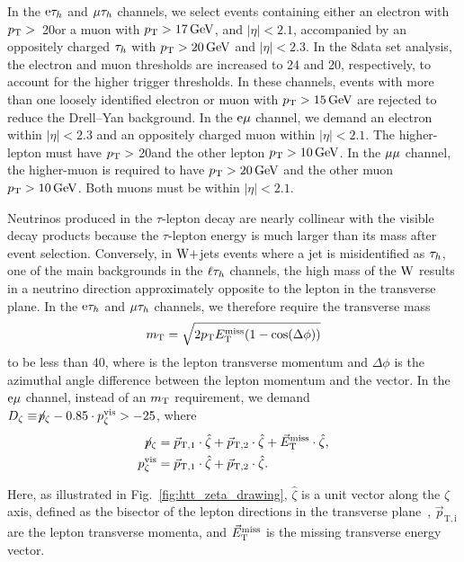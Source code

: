 \documentclass[12pt,twoside,a4paper,cmspaper,final,collab]{cms-tdr}
\begin{document}
In the $\mathrm{e}\tau_h$ and ${\mu}\tau_h$ channels, we select events containing either an electron
with  $p_{\mathrm{T}} >$~20\GeV or a muon with  $p_{\mathrm{T}} >17\,\text{Ge\hspace{-.08em}V}$, and $|\eta| < 2.1$,
accompanied by an oppositely charged $\tau_h$ with $p_{\mathrm{T}} > 20\,\text{Ge\hspace{-.08em}V}$ and $|\eta| < 2.3$.
In the 8\TeV data set analysis, the electron and muon \pt thresholds are
increased to 24 and 20\GeV, respectively, to account for the higher trigger thresholds.
In these channels,
events with more than one loosely identified electron or muon with $p_{\mathrm{T}} >15\,\text{Ge\hspace{-.08em}V}$ are rejected to reduce the Drell--Yan background.
In the $\mathrm{e}{\mu}$ channel, we demand an electron within $|\eta|<2.3$ and an oppositely charged muon within $|\eta|<2.1$.
The higher-\pt lepton must have $p_{\mathrm{T}} >$ 20\GeV and the other lepton $p_{\mathrm{T}} >10\,\text{Ge\hspace{-.08em}V}$.
In the ${\mu}{\mu}$ channel, the higher-\pt muon is required to have $p_{\mathrm{T}}>20\,\text{Ge\hspace{-.08em}V}$ and the other muon $p_{\mathrm{T}}>10\,\text{Ge\hspace{-.08em}V}$.
Both muons must be within $|\eta|<2.1$.

Neutrinos produced in the $\tau$-lepton decay are nearly collinear with the visible decay products
because the $\tau$-lepton energy is much larger than its mass after event selection.
Conversely, in
$\mathrm{W}+$jets events where a jet is misidentified as $\tau_h$, one of the main backgrounds in the $\ell\tau_h$ channels,
the high mass of the
$\mathrm{W}$ results in a neutrino direction approximately opposite to the lepton in the transverse plane.
In the $\mathrm{e}\tau_h$ and ${\mu}\tau_h$ channels, we therefore require the transverse mass
\begin{equation}
m_\mathrm{T} = \sqrt{2 p_{\mathrm{T}} E_{\mathrm{T}}^{\text{miss}} (1-\cos(\Delta\phi))}
\end{equation}
to be less than 40\GeV, where \pt is the lepton transverse momentum
and $\Delta\phi$ is the azimuthal angle difference between the lepton momentum and the \MET vector.
In the $\mathrm{e}{\mu}$ channel, instead of an $m_\mathrm{T}$ requirement, we demand
$D_{\zeta} \equiv \not\!{p_\zeta}- 0.85 \cdot p_\zeta^{\text{vis}} > -25$\GeV, where
\begin{align}
\not\!{p_{\zeta}} &=\vec p_\mathrm{T,1} \cdot \hat \zeta + \vec p_\mathrm{T,2} \cdot \hat \zeta+ {\vec E}_{\mathrm{T}}^{\text{miss}} \cdot \hat \zeta, \\
p_{\zeta}^{\text{vis}} &= \vec{p}_\mathrm{T,1} \cdot \hat \zeta + \vec{p}_\mathrm{T,2} \cdot \hat \zeta.
\end{align}

Here, as illustrated in Fig.~\ref{fig:htt_zeta_drawing}, $\hat \zeta$ is a unit vector along the $\zeta$ axis, defined as the bisector of the lepton directions in the transverse plane~\cite{CRISTOBAL}, $\vec p_\mathrm{T,i}$ are the lepton transverse momenta, and ${\vec E}_{\mathrm{T}}^{\text{miss}}$ is the missing transverse energy vector.
\end{document}
